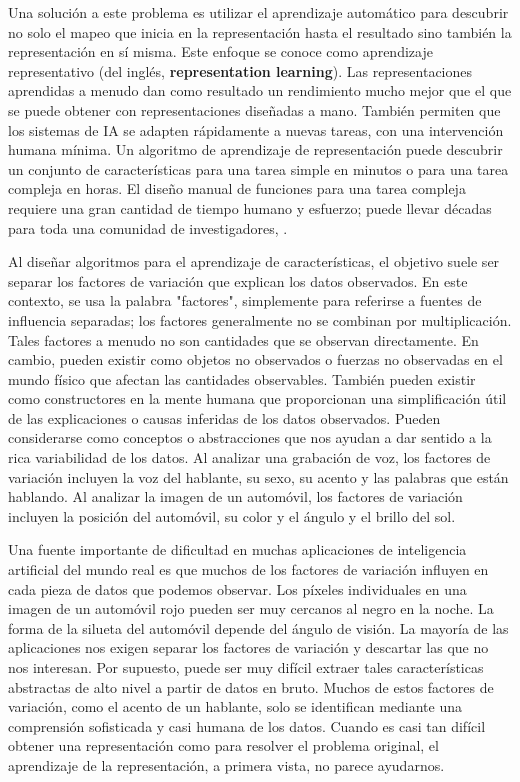 	
	Una solución a este problema es utilizar el aprendizaje automático para descubrir no solo el mapeo que inicia en la representación hasta el resultado sino también la representación en sí misma. Este enfoque se conoce como aprendizaje representativo (del inglés, {\bf representation learning}). Las representaciones aprendidas a menudo dan como resultado un rendimiento mucho mejor que el que se puede obtener con representaciones diseñadas a mano. También permiten que los sistemas de IA se adapten rápidamente a nuevas tareas, con una intervención humana mínima. Un algoritmo de aprendizaje de representación puede descubrir un conjunto de características para una tarea simple en minutos o para una tarea compleja en horas. El diseño manual de funciones para una tarea compleja requiere una gran cantidad de tiempo humano y esfuerzo; puede llevar décadas para toda una comunidad de investigadores, \citep{Goodfellow-et-al-2016}.
	
	Al diseñar algoritmos para el aprendizaje de características, el objetivo suele ser separar los factores de variación que explican los datos observados. En este contexto, se usa la palabra "factores", simplemente para referirse a fuentes de influencia separadas; los factores generalmente no se combinan por multiplicación. Tales factores a menudo no son cantidades que se observan directamente. En cambio, pueden existir como objetos no observados o fuerzas no observadas en el mundo físico que afectan las cantidades observables. También pueden existir como constructores en la mente humana que proporcionan una simplificación útil de las explicaciones o causas inferidas de los datos observados. Pueden considerarse como conceptos o abstracciones que nos ayudan a dar sentido a la rica variabilidad de los datos. Al analizar una grabación de voz, los factores de variación incluyen la voz del hablante, su sexo, su acento y las palabras que están hablando. Al analizar la imagen de un automóvil, los factores de variación incluyen la posición del automóvil, su color y el ángulo y el brillo del sol.
	
	Una fuente importante de dificultad en muchas aplicaciones de inteligencia artificial del mundo real es que muchos de los factores de variación influyen en cada pieza de datos que podemos observar. Los píxeles individuales en una imagen de un automóvil rojo pueden ser muy cercanos al negro en la noche. La forma de la silueta del automóvil depende del ángulo de visión. La mayoría de las aplicaciones nos exigen separar los factores de variación y descartar las que no nos interesan. Por supuesto, puede ser muy difícil extraer tales características abstractas de alto nivel a partir de datos en bruto. Muchos de estos factores de variación, como el acento de un hablante, solo se identifican mediante una comprensión sofisticada y casi humana de los datos. Cuando es casi tan difícil obtener una representación como para resolver el problema original, el aprendizaje de la representación, a primera vista, no parece ayudarnos.
	

